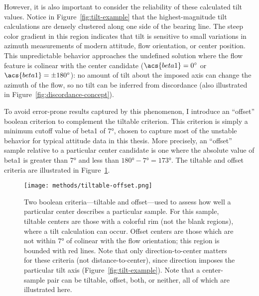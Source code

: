 However, it is also important to consider the reliability of these calculated tilt values. Notice in Figure~\ref{fig:tilt-example} that the highest-magnitude tilt calculations are densely clustered along one side of the \acs{bearing} line. The steep color gradient in this region indicates that tilt is sensitive to small variations in azimuth measurements of modern attitude, flow orientation, or center position. This unpredictable behavior approaches the undefined solution where the flow feature is colinear with the center candidate ($\acs{beta1}=\ang{0}$ or $\acs{beta1}=\pm\ang{180}$): no amount of tilt about the imposed axis can change the azimuth of the flow, so no tilt can be inferred from discordance (also illustrated in Figure~\ref{fig:discordance-concept}).

To avoid error-prone results captured by this phenomenon, I introduce an ``offset'' boolean criterion to complement the tiltable criterion. This criterion is simply a minimum cutoff value of \acs{beta1} of \ang{7}, chosen to capture most of the unstable behavior for typical attitude data in this thesis. More precisely, an ``offset'' sample relative to a particular center candidate is one where the absolute value of \acs{beta1} is greater than \ang{7} and less than $\ang{180} - \ang{7}=\ang{173}$. The tiltable and offset criteria are illustrated in Figure~\ref{fig:tiltable-offset}.

\begin{figure}
    \texttt{[image: methods/tiltable-offset.png]}%
    \caption[Sample criteria: tiltable/offset]{Two boolean criteria---tiltable and offset---used to assess how well a particular center describes a particular sample. For this sample, tiltable centers are those with a colorful rim (not the blank regions), where a tilt calculation can occur. Offset centers are those which are not within \ang{7} of colinear with the flow orientation; this region is bounded with red lines. Note that only direction-to-center matters for these criteria (not distance-to-center), since direction imposes the particular tilt axis (Figure~\ref{fig:tilt-example}). Note that a center-sample pair can be tiltable, offset, both, or neither, all of which are illustrated here.}
    \label{fig:tiltable-offset}
\end{figure}